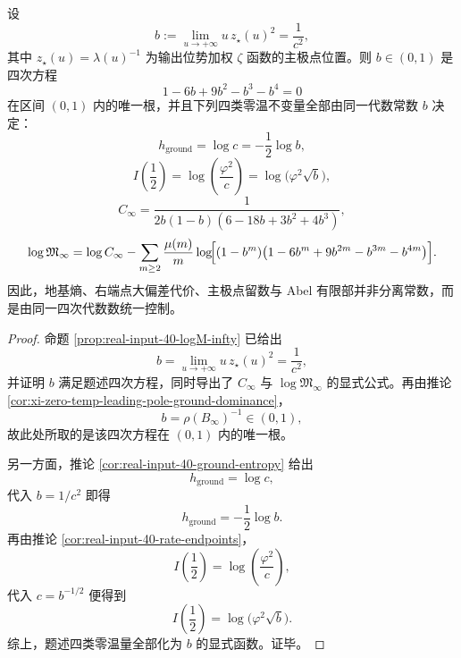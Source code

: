 \begin{theorem}[零温四次常数的统一化]\label{thm:conclusion-realinput40-zero-temp-quartic-constant-unification}
设
\[
b:=\lim_{u\to+\infty}u\,z_\star(u)^2=\frac1{c^2},
\]
其中 \(z_\star(u)=\lambda(u)^{-1}\) 为输出位势加权 \(\zeta\) 函数的主极点位置。则 \(b\in(0,1)\) 是四次方程
\[
1-6b+9b^2-b^3-b^4=0
\]
在区间 \((0,1)\) 内的唯一根，并且下列四类零温不变量全部由同一代数常数 \(b\) 决定：
\[
h_{\mathrm{ground}}
=
\log c
=
-\frac12\log b,
\]
\[
I\!\left(\frac12\right)
=
\log\!\left(\frac{\varphi^2}{c}\right)
=
\log\!\bigl(\varphi^2\sqrt b\bigr),
\]
\[
C_\infty
=
\frac{1}{2b(1-b)(6-18b+3b^2+4b^3)},
\]
\[
\log\mathfrak M_\infty
=
\log C_\infty
-\sum_{m\ge 2}\frac{\mu(m)}{m}
\log\!\Bigl[(1-b^m)\bigl(1-6b^m+9b^{2m}-b^{3m}-b^{4m}\bigr)\Bigr].
\]
因此，地基熵、右端点大偏差代价、主极点留数与 Abel 有限部并非分离常数，而是由同一四次代数数统一控制。
\end{theorem}
\begin{proof}
命题 \ref{prop:real-input-40-logM-infty} 已给出
\[
b=\lim_{u\to+\infty}u\,z_\star(u)^2=\frac1{c^2},
\]
并证明 \(b\) 满足题述四次方程，同时导出了 \(C_\infty\) 与 \(\log\mathfrak M_\infty\) 的显式公式。再由推论 \ref{cor:xi-zero-temp-leading-pole-ground-dominance}，
\[
b=\rho(B_\infty)^{-1}\in(0,1),
\]
故此处所取的是该四次方程在 \((0,1)\) 内的唯一根。

另一方面，推论 \ref{cor:real-input-40-ground-entropy} 给出
\[
h_{\mathrm{ground}}=\log c,
\]
代入 \(b=1/c^2\) 即得
\[
h_{\mathrm{ground}}=-\frac12\log b.
\]
再由推论 \ref{cor:real-input-40-rate-endpoints}，
\[
I\!\left(\frac12\right)=\log\!\left(\frac{\varphi^2}{c}\right),
\]
代入 \(c=b^{-1/2}\) 便得到
\[
I\!\left(\frac12\right)=\log\!\bigl(\varphi^2\sqrt b\bigr).
\]
综上，题述四类零温量全部化为 \(b\) 的显式函数。证毕。
\end{proof}

